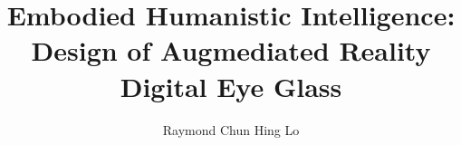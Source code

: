 \documentclass[doublespaced]{ut-thesis}
\author{Raymond Chun Hing Lo}
\title{Embodied Humanistic Intelligence: Design of Augmediated Reality Digital Eye Glass}
\begin{document}


\begin{preliminary}

\maketitle


\begin{abstract}





\end{abstract}
\end{preliminary}
\end{document}
